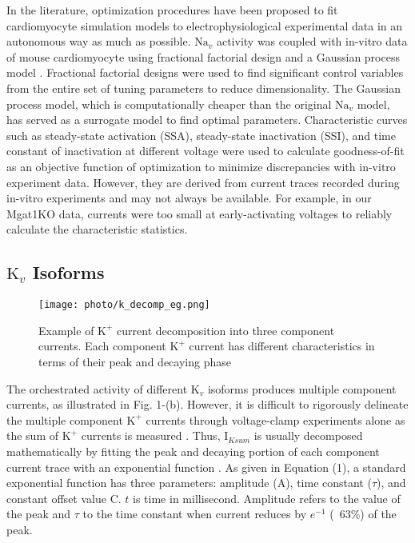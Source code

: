 \documentclass[journal]{IEEEtran}
\begin{document}
In the literature, optimization procedures have been proposed to fit cardiomyocyte simulation models to electrophysiological experimental data in an autonomous way as much as possible. $\text{Na}_{v}$ activity was coupled with in-vitro data of mouse cardiomyocyte using fractional factorial design and a Gaussian process model \cite{du2015statistical}. Fractional factorial designs were used to find significant control variables from the entire set of tuning parameters to reduce dimensionality. The Gaussian process model, which is computationally cheaper than the original $\text{Na}_{v}$ model, has served as a surrogate model to find optimal parameters. Characteristic curves such as steady-state activation (SSA), steady-state inactivation (SSI), and time constant of inactivation at different voltage were used to calculate goodness-of-fit as an objective function of optimization to minimize discrepancies with in-vitro experiment data. However, they are derived from current traces recorded during in-vitro experiments and may not always be available. For example, in our Mgat1KO data, currents were too small at early-activating voltages to reliably calculate the characteristic statistics.  

\subsection{$\text{K}_{v}$ Isoforms}
\begin{figure}
    \label{fig3}
    \centering
    \texttt{[image: photo/k\_decomp\_eg.png]}
    \caption{Example of $\text{K}^{+}$ current decomposition into three component currents. Each component $\text{K}^{+}$ current has different characteristics in terms of their peak and decaying phase}
\end{figure}
The orchestrated activity of different $\text{K}_{v}$ isoforms produces multiple component currents, as illustrated in Fig. 1-(b). However, it is difficult to rigorously delineate the multiple component $\text{K}^{+}$ currents through voltage-clamp experiments alone as the sum of $\text{K}^{+}$ currents is measured \cite{brouillette2004functional}. Thus, $\text{I}_{Ksum}$ is usually decomposed mathematically by fitting the peak and decaying portion of each component current trace with an exponential function \cite{brunet2004heterogeneous}. As given in Equation (1), a standard exponential function has three parameters: amplitude ($\text{A}$), time constant ($\tau$), and constant offset value $\text{C}$. $t$ is time in millisecond. Amplitude refers to the value of the peak and $\tau$ to the time constant when current reduces by $e^{-1}$ (~63\%) of the peak. 
\end{document}
